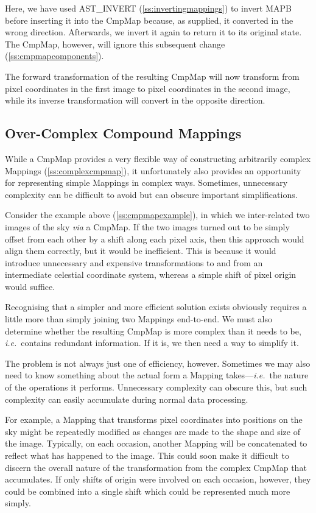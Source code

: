 \documentclass[twoside,11pt]{article}
\newcommand{\htmlref}[2]{#1}
\newcommand{\secref}[1]{\S\ref{#1}}
\renewcommand{\secref}[1]{\ref{#1}}
\begin{document}
Here, we have used \htmlref{AST\_INVERT}{AST_INVERT} (\secref{ss:invertingmappings}) to
invert MAPB before inserting it into the CmpMap because, as supplied,
it converted in the wrong direction. Afterwards, we invert it again to
return it to its original state. The CmpMap, however, will ignore this
subsequent change (\secref{ss:cmpmapcomponents}).

The forward transformation of the resulting CmpMap will now transform
from pixel coordinates in the first image to pixel coordinates in the
second image, while its inverse transformation will convert in the
opposite direction.

\subsection{\label{ss:overcomplexcmpmaps}Over-Complex Compound Mappings}

While a \htmlref{CmpMap}{CmpMap} provides a very flexible way of constructing
arbitrarily complex Mappings (\secref{ss:complexcmpmap}), it
unfortunately also provides an opportunity for representing simple
Mappings in complex ways. Sometimes, unnecessary complexity can be
difficult to avoid but can obscure important simplifications.

Consider the example above (\secref{ss:cmpmapexample}), in which we
inter-related two images of the sky {\em{via}} a CmpMap.  If the two
images turned out to be simply offset from each other by a shift along
each pixel axis, then this approach would align them correctly, but it
would be inefficient. This is because it would introduce unnecessary
and expensive transformations to and from an intermediate celestial
coordinate system, whereas a simple shift of pixel origin would
suffice.

Recognising that a simpler and more efficient solution exists
obviously requires a little more than simply joining two Mappings
end-to-end. We must also determine whether the resulting CmpMap is
more complex than it needs to be, {\em{i.e.}}\ contains redundant
information. If it is, we then need a way to simplify it.

The problem is not always just one of efficiency, however. Sometimes
we may also need to know something about the actual form a \htmlref{Mapping}{Mapping}
takes---{\em{i.e.}}\ the nature of the operations it performs.
Unnecessary complexity can obscure this, but such complexity can
easily accumulate during normal data processing.

For example, a Mapping that transforms pixel coordinates into
positions on the sky might be repeatedly modified as changes are made
to the shape and size of the image. Typically, on each occasion,
another Mapping will be concatenated to reflect what has happened to
the image. This could soon make it difficult to discern the overall
nature of the transformation from the complex CmpMap that
accumulates. If only shifts of origin were involved on each occasion,
however, they could be combined into a single shift which could be
represented much more simply.
\end{document}
